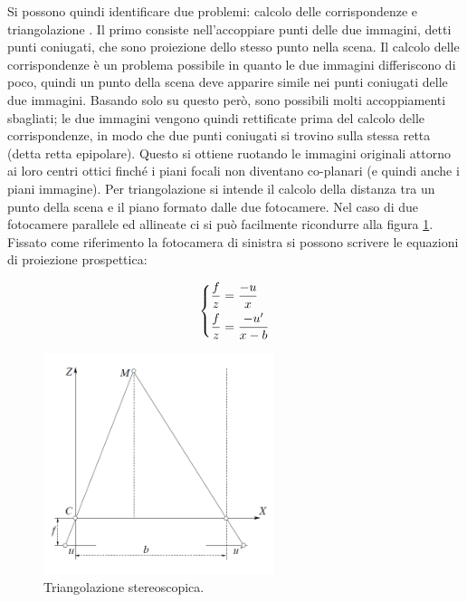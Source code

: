 \documentclass[12pt]{report}
\begin{document}
			Si possono quindi identificare due problemi: calcolo delle corrispondenze e triangolazione \cite{fusiello}.\newline
			Il primo consiste nell'accoppiare punti delle due immagini, detti punti coniugati, che sono proiezione dello stesso punto nella scena. Il calcolo delle corrispondenze è un problema possibile in quanto le due immagini differiscono di poco, quindi un punto della scena deve apparire simile nei punti coniugati delle due immagini. Basando solo su questo però, sono possibili molti accoppiamenti sbagliati; le due immagini vengono quindi rettificate prima del calcolo delle corrispondenze, in modo che due punti coniugati si trovino sulla stessa retta (detta retta epipolare). Questo si ottiene ruotando le immagini originali attorno ai loro centri ottici finché i piani 
			focali non diventano co-planari (e quindi anche i piani immagine).\newline
			Per triangolazione si intende il calcolo della distanza tra un punto della scena e il piano formato dalle due fotocamere. Nel caso di due fotocamere parallele ed allineate ci si può facilmente ricondurre alla figura \ref{fig:triangolazione}.\newline
			Fissato come riferimento la fotocamera di sinistra si possono scrivere le equazioni di proiezione prospettica:
			
			\begin{equation}
				\begin{dcases}
					\frac{f}{z}=\frac{-u}{x} \\
					\frac{f}{z}=\frac{-u'}{x-b}
				\end{dcases}
				\label{eq:sistema}
			\end{equation}
			
			\begin{figure}
				\includegraphics[width=0.6\textwidth]{./figures/Triangolazione_stereoscopica.png}
				\caption{Triangolazione stereoscopica.}
				\label{fig:triangolazione}
			\end{figure}
			
\end{document}
